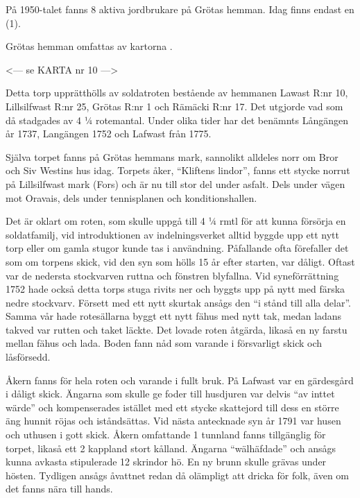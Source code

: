 På 1950-talet fanns 8 aktiva jordbrukare på Grötas hemman. Idag finns endast en (1).

Grötas hemman omfattas av kartorna .


<--- se KARTA nr 10 --->





Detta torp upprätthölls av soldatroten bestående av hemmanen Lawast R:nr 10, Lillsilfwast R:nr 25, Grötas R:nr 1 och Rämäcki R:nr 17. Det utgjorde vad som då stadgades av 4 ¼ rotemantal. Under olika tider har det benämnts Långängen år 1737, Langängen 1752 och Lafwast från 1775.

Själva torpet fanns på Grötas hemmans mark, sannolikt alldeles norr om Bror och Siv Westins hus idag. Torpets åker, ``Kliftens lindor'', fanns ett stycke norrut på Lillsilfwast mark (Fors) och är nu till stor del under asfalt. Dels under vägen mot Oravais, dels under tennisplanen och konditionshallen.

Det är oklart om roten, som skulle uppgå till 4 ¼ rmtl för att kunna försörja en soldatfamilj, vid introduktionen av indelningsverket alltid byggde upp ett nytt torp eller om gamla stugor kunde tas i användning. Påfallande ofta förefaller det som om torpens skick, vid den syn som hölls 15 år efter starten, var dåligt. Oftast var de nedersta stockvarven ruttna och fönstren blyfallna. Vid syneförrättning 1752 hade också detta torps stuga rivits ner och byggts upp på nytt med färska nedre stockvarv. Försett med ett nytt skurtak ansågs den ``i stånd till alla delar''. Samma vår hade rotesällarna byggt ett nytt fähus med nytt tak, medan ladans takved var rutten och taket läckte. Det lovade roten åtgärda, likaså en ny farstu mellan fähus och lada. Boden fann nåd som varande i försvarligt skick och låsförsedd.

Åkern fanns för hela roten och varande i fullt bruk. På Lafwast var en gärdesgård i dåligt skick. Ängarna som skulle ge foder till husdjuren var delvis ``av inttet wärde'' och kompenserades istället med ett stycke skattejord till dess en större äng hunnit röjas och iståndsättas. Vid nästa antecknade syn år 1791 var husen och uthusen i gott skick. Åkern omfattande 1 tunnland fanns tillgänglig för torpet, likaså ett 2 kappland stort kålland. Ängarna ``wälhäfdade'' och ansågs kunna avkasta stipulerade 12 skrindor hö. En ny brunn skulle grävas under hösten. Tydligen ansågs åvattnet redan då olämpligt att dricka för folk, även om det fanns nära till hands.

